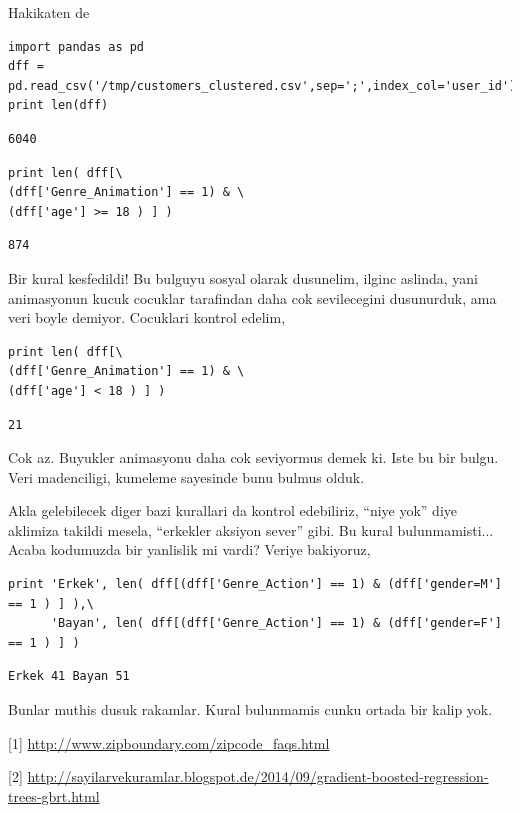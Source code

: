 \documentclass[12pt,fleqn]{article}\usepackage{../common}
\begin{document}
Hakikaten de 

\begin{verbatim}
import pandas as pd
dff = pd.read_csv('/tmp/customers_clustered.csv',sep=';',index_col='user_id')
print len(dff)
\end{verbatim}

\begin{verbatim}
6040
\end{verbatim}

\begin{verbatim}
print len( dff[\
(dff['Genre_Animation'] == 1) & \
(dff['age'] >= 18 ) ] )
\end{verbatim}

\begin{verbatim}
874
\end{verbatim}

Bir kural kesfedildi! Bu bulguyu sosyal olarak dusunelim, ilginc aslinda,
yani animasyonun kucuk cocuklar tarafindan daha cok sevilecegini
dusunurduk, ama veri boyle demiyor. Cocuklari kontrol edelim,

\begin{verbatim}
print len( dff[\
(dff['Genre_Animation'] == 1) & \
(dff['age'] < 18 ) ] )
\end{verbatim}

\begin{verbatim}
21
\end{verbatim}

Cok az. Buyukler animasyonu daha cok seviyormus demek ki.  Iste bu bir
bulgu. Veri madenciligi, kumeleme sayesinde bunu bulmus olduk.

Akla gelebilecek diger bazi kurallari da kontrol edebiliriz, ``niye yok''
diye aklimiza takildi mesela, ``erkekler aksiyon sever'' gibi. Bu kural
bulunmamisti... Acaba kodumuzda bir yanlislik mi vardi? Veriye bakiyoruz,

\begin{verbatim}
print 'Erkek', len( dff[(dff['Genre_Action'] == 1) & (dff['gender=M'] == 1 ) ] ),\
      'Bayan', len( dff[(dff['Genre_Action'] == 1) & (dff['gender=F'] == 1 ) ] )
\end{verbatim}

\begin{verbatim}
Erkek 41 Bayan 51
\end{verbatim}

Bunlar muthis dusuk rakamlar. Kural bulunmamis cunku ortada bir kalip yok.

[1] \url{http://www.zipboundary.com/zipcode_faqs.html}

[2] \url{http://sayilarvekuramlar.blogspot.de/2014/09/gradient-boosted-regression-trees-gbrt.html}
\end{document}
